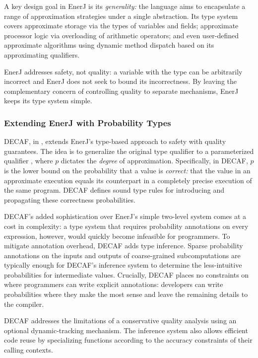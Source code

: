 A key design goal in EnerJ is its \emph{generality:}
the language aims to encapsulate a range of approximation strategies under a
single abstraction.
Its type system covers approximate storage via the types of variables and
fields;
approximate processor logic via overloading of arithmetic operators;
and even user-defined approximate algorithms using dynamic method dispatch
based on its approximating qualifiers.

EnerJ addresses safety, not quality:
a variable with the type  can be arbitrarily incorrect and
EnerJ does not seek to bound its incorrectness.
By leaving the complementary concern of controlling quality to separate
mechanisms, EnerJ keeps its type system simple.

\subsubsection{Extending EnerJ with Probability Types}

DECAF, in , extends EnerJ's type-based approach to safety with
quality guarantees.
The idea is to generalize the original  type qualifier to a
parameterized qualifier , where $p$ dictates the
\emph{degree} of approximation.
Specifically, in DECAF, $p$ is the lower bound on the probability that a value
is \emph{correct:} that the value in an approximate execution equals its
counterpart in a completely precise execution of the same program.
DECAF defines sound type rules for introducing and propagating these
correctness probabilities.

DECAF's added sophistication over EnerJ's simple two-level system comes at a
cost in complexity:
a type system that requires probability annotations on every expression,
however, would quickly become infeasible for programmers.
To mitigate annotation overhead, DECAF adds type inference.
Sparse probability annotations on the inputs and outputs of coarse-grained
subcomputations are typically enough for DECAF's inference system to determine
the less-intuitive probabilities for intermediate values.
Crucially, DECAF places no constraints on where programmers can write explicit
annotations:
developers can write probabilities where they make the most sense and leave
the remaining details to the compiler.

DECAF addresses the limitations of a conservative quality analysis using
an optional dynamic-tracking mechanism.
The inference system also allows efficient code reuse by specializing
functions according to the accuracy constraints of their calling contexts.

